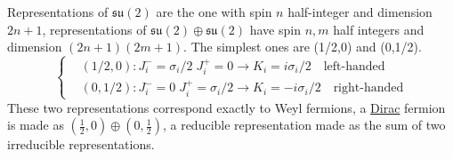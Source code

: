 \documentclass[../main.tex]{subfiles}
\begin{document}
Representations of $\mathfrak{su}(2)$ are the one with spin $n$ half-integer and dimension $2n+1$, representations of $\mathfrak{su}(2)\oplus\mathfrak{su}(2)$ have spin $n,m$ half integers and dimension $(2n+1)(2m+1)$. The simplest ones are (1/2,0) and (0,1/2).
\[
\left\{
\begin{aligned}
&(1/2,0): J_i^-=\sigma_i/2\; J_i^+=0\to K_i=i\sigma_i/2 \quad \text{left-handed}\\
&(0,1/2): J_i^-=0\; J_i^+=\sigma_i/2\to K_i=-i\sigma_i/2 \quad \text{right-handed}
\end{aligned}
\right.
\]
These two representations correspond exactly to Weyl fermions, a \href{https://en.wikipedia.org/wiki/Paul_Dirac}{Dirac} fermion is made as $(\frac{1}{2},0)\oplus(0,\frac{1}{2})$, a reducible representation made as the sum of two irreducible representations.\\
\end{document}
